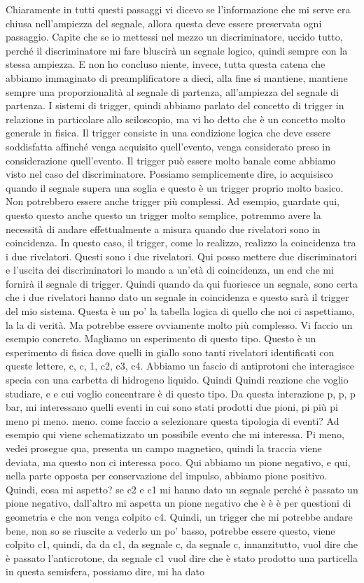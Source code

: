 {Chiaramente in tutti questi passaggi vi dicevo se l'informazione che mi serve era chiusa nell'ampiezza del segnale, allora questa deve essere preservata ogni passaggio. Capite che se io mettessi nel mezzo un discriminatore, uccido tutto, perché il discriminatore mi fare bluscirà un segnale logico, quindi sempre con la stessa ampiezza. E non ho concluso niente, invece, tutta questa catena che abbiamo immaginato di preamplificatore a dieci, alla fine si mantiene, mantiene sempre una proporzionalità al segnale di partenza, all'ampiezza del segnale di partenza. I sistemi di trigger, quindi abbiamo parlato del concetto di trigger in relazione in particolare allo sciloscopio, ma vi ho detto che è un concetto molto generale in fisica. Il trigger consiste in una condizione logica che deve essere soddisfatta affinché venga acquisito quell'evento, venga considerato preso in considerazione quell'evento. Il trigger può essere molto banale come abbiamo visto nel caso del discriminatore. Possiamo semplicemente dire, io acquisisco quando il segnale supera una soglia e questo è un trigger proprio molto basico. Non potrebbero essere anche trigger più complessi. Ad esempio, guardate qui, questo questo anche questo un trigger molto semplice, potremmo avere la necessità di andare effettualmente a misura quando due rivelatori sono in coincidenza. In questo caso, il trigger, come lo realizzo, realizzo la coincidenza tra i due rivelatori. Questi sono i due rivelatori. Qui posso mettere due discriminatori e l'uscita dei discriminatori lo mando a un'età di coincidenza, un end che mi fornirà il segnale di trigger. Quindi quando da qui fuoriesce un segnale, sono certa che i due rivelatori hanno dato un segnale in coincidenza e questo sarà il trigger del mio sistema. Questa è un po' la tabella logica di quello che noi ci aspettiamo, la la di verità. Ma potrebbe essere ovviamente molto più complesso. Vi faccio un esempio concreto. Magliamo un esperimento di questo tipo. Questo è un esperimento di fisica dove quelli in giallo sono tanti rivelatori identificati con queste lettere, c, c, 1, c2, c3, c4. Abbiamo un fascio di antiprotoni che interagisce specia con una carbetta di hidrogeno liquido. Quindi Quindi reazione che voglio studiare, e e cui voglio concentrare è di questo tipo. Da questa interazione p, p, p bar, mi interessano quelli eventi in cui sono stati prodotti due pioni, pi più pi meno pi meno. meno. come faccio a selezionare questa tipologia di eventi? Ad esempio qui viene schematizzato un possibile evento che mi interessa. Pi meno, vedei prosegue qua, presenta un campo magnetico, quindi la traccia viene deviata, ma questo non ci interessa poco. Qui abbiamo un pione negativo, e qui, nella parte opposta per conservazione del impulso, abbiamo pione positivo. Quindi, cosa mi aspetto? se c2 e c1 mi hanno dato un segnale perché è passato un pione negativo, dall'altro mi aspetta un pione negativo che è è è per questioni di geometria e che non venga colpito c4. Quindi, un trigger che mi potrebbe andare bene, non so se riuscite a vederlo un po' basso, potrebbe essere questo, viene colpito c1, quindi, da da c1, da segnale c, da segnale c, innanzitutto, vuol dire che è passato l'anticrotone, da segnale c1 vuol dire che è stato prodotto una particella in questa semisfera, possiamo dire, mi ha dato }
